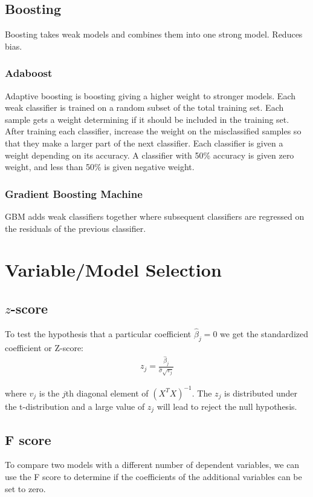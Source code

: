 \documentclass[12pt]{article}
\begin{document}
\begin{&itemize}
\subsection{Boosting}
Boosting takes weak models and combines them into one strong model. Reduces bias.
\subsubsection{Adaboost}
Adaptive boosting is boosting giving a higher weight to stronger models. Each weak classifier is trained on a random subset of the total training set. Each sample gets a weight determining if it should be included in the training set. After training each classifier, increase the weight on the misclassified samples so that they make a larger part of the next classifier. Each classifier is given a weight depending on its accuracy. A classifier with 50\% accuracy is given zero weight, and less than 50\% is given negative weight.
\subsubsection{Gradient Boosting Machine}
GBM adds weak classifiers together where subsequent classifiers are regressed on the residuals of the previous classifier.

\section{Variable/Model Selection}

\subsection{$z$-score}
To test the hypothesis that a particular coefficient $\hat{\beta}_j = 0$ we get the standardized coefficient or Z-score:
\begin{align*}
z_j = \frac{\hat{\beta}_j}{\hat{\sigma}\sqrt{v_j}}
\end{align*}

where $v_j$ is the $j$th diagonal element of $(X^TX)^{-1}$. The $z_j$ is distributed under the t-distribution and a large value of $z_j$ will lead to reject the null hypothesis.

\subsection{F score}
To compare two models with a different number of dependent variables, we can use the F score to determine if the coefficients of the additional variables can be set to zero.


\end{&itemize}
\end{document}
